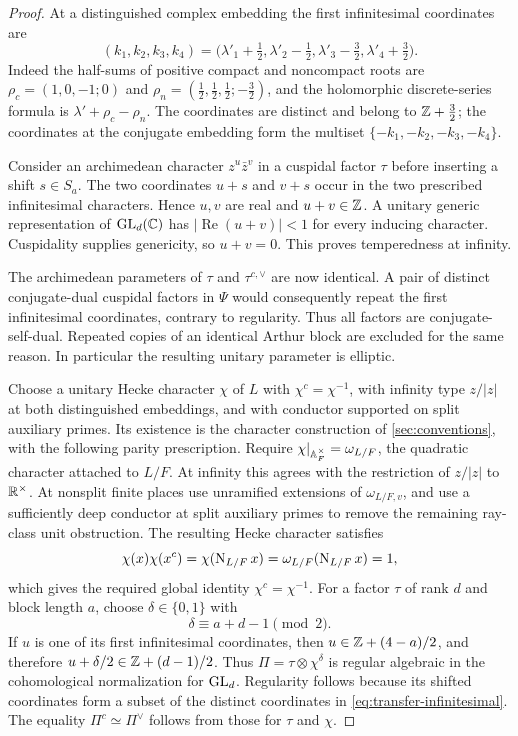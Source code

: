 \begin{proof}
At a distinguished complex embedding the first infinitesimal
coordinates are
\begin{equation}
 (k_1,k_2,k_3,k_4)
 =\bigl(\lambda'_1+\tfrac12,\lambda'_2-\tfrac12,
        \lambda'_3-\tfrac32,\lambda'_4+\tfrac32\bigr).
 \label{eq:transfer-infinitesimal}
\end{equation}
Indeed the half-sums of positive compact and noncompact roots are
$\rho_c=(1,0,-1;0)$ and
$\rho_n=(\tfrac12,\tfrac12,\tfrac12;-\tfrac32)$, and the
holomorphic discrete-series formula is $\lambda'+\rho_c-\rho_n$.
The coordinates are distinct and belong to $\mathbb Z+\tfrac32$; the
coordinates at the conjugate embedding form the multiset
$\{-k_1,-k_2,-k_3,-k_4\}$.

Consider an archimedean character $z^u\bar z^v$ in a cuspidal factor
$\tau$ before inserting a shift $s\in S_a$.  The two coordinates
$u+s$ and $v+s$ occur in the two prescribed infinitesimal
characters.  Hence $u,v$ are real and $u+v\in\mathbb Z$.
A unitary generic representation of $\operatorname{GL}_d(\mathbb C)$ has
$|\operatorname{Re}(u+v)|<1$ for every inducing character.
Cuspidality supplies genericity, so $u+v=0$.  This proves
temperedness at infinity.

The archimedean parameters of $\tau$ and $\tau^{c,\vee}$ are now
identical.  A pair of distinct conjugate-dual cuspidal factors in
$\Psi$ would consequently repeat the first infinitesimal
coordinates, contrary to regularity.  Thus all factors are
conjugate-self-dual.  Repeated copies of an identical Arthur block
are excluded for the same reason.  In particular the resulting
unitary parameter is elliptic.

Choose a unitary Hecke character $\chi$ of $L$ with
$\chi^c=\chi^{-1}$, with infinity type $z/|z|$ at both
distinguished embeddings, and with conductor supported on split
auxiliary primes.  Its existence is the character construction of
\cref{sec:conventions}, with the following parity prescription.
Require $\chi|_{\mathbb A_F^\times}=\omega_{L/F}$, the quadratic
character attached to $L/F$.  At infinity this agrees with the
restriction of $z/|z|$ to $\mathbb R^\times$.  At nonsplit finite places
use unramified extensions of $\omega_{L/F,v}$, and use a sufficiently
deep conductor at split auxiliary primes to remove the remaining
ray-class unit obstruction.  The resulting Hecke character satisfies
\[
 \chi(x)\chi(x^c)=\chi(\operatorname{N}_{L/F}x)
      =\omega_{L/F}(\operatorname{N}_{L/F}x)=1,
\]
which gives the required global identity $\chi^c=\chi^{-1}$.
For a factor $\tau$ of rank $d$ and block
length $a$, choose $\delta\in\{0,1\}$ with
\[
 \delta\equiv a+d-1\pmod2.
\]
If $u$ is one of its first infinitesimal coordinates, then
$u\in\mathbb Z+(4-a)/2$, and therefore
$u+\delta/2\in\mathbb Z+(d-1)/2$.
Thus $\Pi=\tau\otimes\chi^\delta$ is regular algebraic in the
cohomological normalization for $\operatorname{GL}_d$.
Regularity follows because its shifted coordinates form a subset
of the distinct coordinates in \cref{eq:transfer-infinitesimal}.
The equality $\Pi^c\simeq\Pi^\vee$ follows from those for
$\tau$ and $\chi$.
\end{proof}

